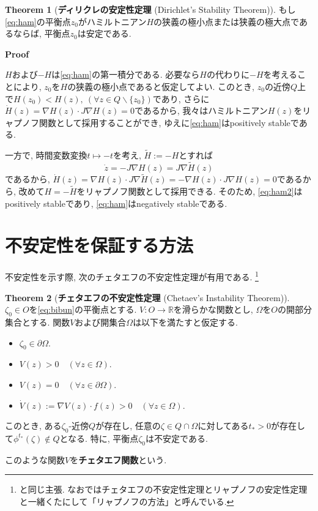 \documentclass[a4paper]{ujarticle}
\makeatletter
\theoremstyle{definition}
\newtheorem{theorem}{Theorem}
\renewenvironment{proof}[1][Proof]{\par
  \pushQED{\qed}%
  \normalfont \topsep6\p@\@plus6\p@\relax
  \trivlist
  \item\relax
  {\bfseries
  #1\@addpunct{.}}\hspace\labelsep\ignorespaces
}{%
  \popQED\endtrivlist\@endpefalse
}
\makeatother
\begin{document}
    \begin{theorem}[\textbf{ディリクレの安定性定理} (Dirichlet's Stability Theorem)]
        もし\eqref{eq:ham}の平衡点$z_0$がハミルトニアン$H$の狭義の極小点または狭義の極大点であるならば,
        平衡点$z_0$は安定である.
    \end{theorem}

    \begin{proof}
        $H$および$- H$は\eqref{eq:ham}の第一積分である. 
        必要なら$H$の代わりに$- H$を考えることにより, $z_0$を$H$の狭義の極小点であると仮定してよい.
        このとき, $z_0$の近傍$Q$上で$H(z_0) < H(z), \ (\forall z \in Q \backslash \{z_0\})$であり,
        さらに$\dot{H}(z) = \nabla H(z) \cdot J \nabla H(z) = 0$であるから, 我々はハミルトニアン$H(z)$をリャプノフ関数として採用することができ,
        ゆえに\eqref{eq:ham}はpositively stableである.

        一方で, 時間変数変換$t \mapsto - t$を考え, $\tilde{H} := - H$とすれば
        \begin{equation} \label{eq:ham2}
            \dot{z} = - J \nabla H(z) = J \nabla \tilde{H}(z)
        \end{equation}
        であるから,
        $\dot{H}(z) = \nabla H(z) \cdot J \nabla \tilde{H}(z) = - \nabla H(z) \cdot J \nabla H(z) = 0$であるから,
        改めて$H = - \tilde{H}$をリャプノフ関数として採用できる. 
        そのため, \eqref{eq:ham2}はpositively stableであり, \eqref{eq:ham}はnegatively stableである.
    \end{proof}

    \section{不安定性を保証する方法}

    不安定性を示す際, 次のチェタエフの不安定性定理が有用である.
    \footnote{\cite[定理28.5]{Kasahara}と同じ主張. なお\cite{Kasahara}ではチェタエフの不安定性定理とリャプノフの安定性定理と一緒くたにして「リャプノフの方法」と呼んでいる.}

    \begin{theorem}[\textbf{チェタエフの不安定性定理} (Chetaev's Instability Theorem)]
        $\zeta_{0} \in O$を\eqref{eq:bibun}の平衡点とする.
        $V: O \rightarrow \mathbb{R}$を滑らかな関数とし, $\Omega$を$O$の開部分集合とする.
        関数$V$および開集合$\Omega$は以下を満たすと仮定する.
        \begin{itemize}
            \item $\zeta_0 \in \partial \Omega$.
            \item $V(z) > 0 \quad (\forall z \in \Omega)$.
            \item $V(z) = 0 \quad (\forall z \in \partial \Omega)$.
            \item $\dot{V}(z) := \nabla V(z) \cdot f(z) > 0 \quad (\forall z \in \Omega)$.
        \end{itemize}
        このとき, ある$\zeta_0$-近傍$Q$が存在し, 任意の$\zeta \in Q \cap \Omega$に対してある$t_{*} > 0$が存在して$\phi^{t_{*}}(\zeta) \notin Q$となる.
        特に, 平衡点$\zeta_0$は不安定である. 
    \end{theorem}
    このような関数$V$を\textbf{チェタエフ関数}という.
\end{document}
